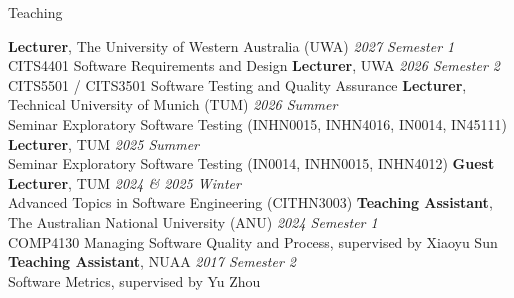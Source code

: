 \documentclass[
	11pt, %
]{resume} %
\begin{document}
\begin{rSection}{Teaching}

\textbf{Lecturer}, The University of Western Australia (UWA) \hfill \textit{2027 Semester 1} \\
CITS4401 Software Requirements and Design
\newline\newline
\textbf{Lecturer}, UWA \hfill \textit{2026 Semester 2} \\
CITS5501 / CITS3501 Software Testing and Quality Assurance
\newline\newline
\textbf{Lecturer}, Technical University of Munich (TUM) \hfill \textit{2026 Summer} \\
Seminar Exploratory Software Testing (INHN0015, INHN4016, IN0014, IN45111)
\newline\newline
\textbf{Lecturer}, TUM \hfill \textit{2025 Summer} \\
Seminar Exploratory Software Testing (IN0014, INHN0015, INHN4012)
\newline\newline
\textbf{Guest Lecturer}, TUM \hfill \textit{2024 \& 2025 Winter} \\
Advanced Topics in Software Engineering (CITHN3003)
\newline\newline
\textbf{Teaching Assistant}, The Australian National University (ANU) \hfill \textit{2024 Semester 1} \\
COMP4130 Managing Software Quality and Process, supervised by Xiaoyu Sun
\newline\newline
\textbf{Teaching Assistant}, NUAA \hfill \textit{2017 Semester 2} \\
Software Metrics, supervised by Yu Zhou

\end{rSection}
\end{document}
